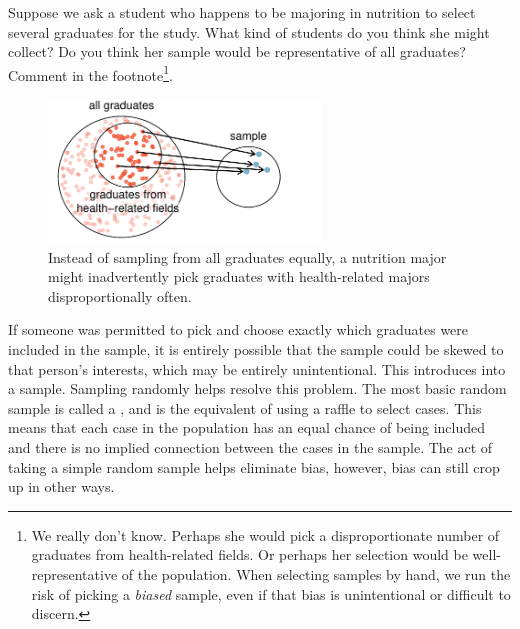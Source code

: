 \begin{exercise}
Suppose we ask a student who happens to be majoring in nutrition to select several graduates for the study. What kind of students do you think she might collect? Do you think her sample would be representative of all graduates? Comment in the footnote\footnote{We really don't know. Perhaps she would pick a disproportionate number of graduates from health-related fields. Or perhaps her selection would be well-representative of the population. When selecting samples by hand, we run the risk of picking a \emph{biased} sample, even if that bias is unintentional or difficult to discern.}.
\end{exercise}
\begin{figure}
\centering
\includegraphics[height=1.5in]{01/figures/popToSample/popToSubSampleGraduates}
\caption{Instead of sampling from all graduates equally, a nutrition major might inadvertently pick graduates with health-related majors disproportionally often.}
\label{popToSubSampleGraduates}
\end{figure}

If someone was permitted to pick and choose exactly which graduates were included in the sample, it is entirely possible that the sample could be skewed to that person's interests, which may be entirely unintentional. This introduces  into a sample. Sampling randomly helps resolve this problem. The most basic random sample is called a , and is the equivalent of using a raffle to select cases. This means that each case in the population has an equal chance of being included and there is no implied connection between the cases in the sample. The act of taking a simple random sample helps eliminate bias, however, bias can still crop up in other ways.

